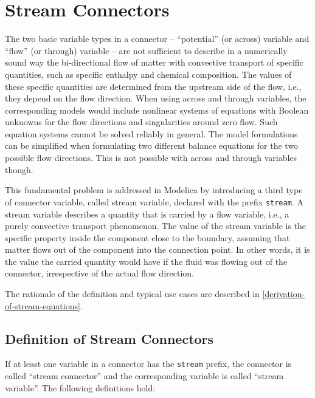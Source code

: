 \chapter{Stream Connectors}


The two basic variable types in a connector -- ``potential'' (or across)
variable and ``flow'' (or through) variable -- are not sufficient to
describe in a numerically sound way the bi-directional flow of matter
with convective transport of specific quantities, such as specific
enthalpy and chemical composition. The values of these specific
quantities are determined from the upstream side of the flow, i.e., they
depend on the flow direction. When using across and through variables,
the corresponding models would include nonlinear systems of equations
with Boolean unknowns for the flow directions and singularities around
zero flow. Such equation systems cannot be solved reliably in general.
The model formulations can be simplified when formulating two different
balance equations for the two possible flow directions. This is not
possible with across and through variables though.

This fundamental problem is addressed in Modelica by introducing a third
type of connector variable, called stream variable, declared with the
prefix \lstinline!stream!. A stream variable describes a quantity that is
carried by a flow variable, i.e., a purely convective transport
phenomenon. The value of the stream variable is the specific property
inside the component close to the boundary, assuming that matter flows
out of the component into the connection point. In other words, it is
the value the carried quantity would have if the fluid was flowing out
of the connector, irrespective of the actual flow direction.

The rationale of the definition and typical use cases are described in
\autoref{derivation-of-stream-equations}.

\section{Definition of Stream Connectors}

If at least one variable in a connector has the \lstinline!stream! prefix,
the connector is called ``stream connector'' and the corresponding
variable is called ``stream variable''. The following definitions hold:

